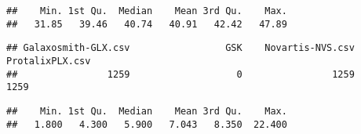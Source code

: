 \documentclass[
]{article}
\newenvironment{Shaded}{\begin{snugshade}}{\end{snugshade}}
\newcommand{\KeywordTok}[1]{\textcolor[rgb]{0.13,0.29,0.53}{\textbf{#1}}}
\newcommand{\NormalTok}[1]{#1}
\newcommand{\OperatorTok}[1]{\textcolor[rgb]{0.81,0.36,0.00}{\textbf{#1}}}
\newcommand{\StringTok}[1]{\textcolor[rgb]{0.31,0.60,0.02}{#1}}
\begin{document}
\begin{verbatim}
##    Min. 1st Qu.  Median    Mean 3rd Qu.    Max. 
##   31.85   39.46   40.74   40.91   42.42   47.89
\end{verbatim}

\begin{Shaded}
\end{Shaded}

\begin{verbatim}
## Galaxosmith-GLX.csv                 GSK    Novartis-NVS.csv     ProtalixPLX.csv 
##                1259                   0                1259                1259
\end{verbatim}

\begin{Shaded}
\end{Shaded}

\begin{verbatim}
##    Min. 1st Qu.  Median    Mean 3rd Qu.    Max. 
##   1.800   4.300   5.900   7.043   8.350  22.400
\end{verbatim}
\end{document}
